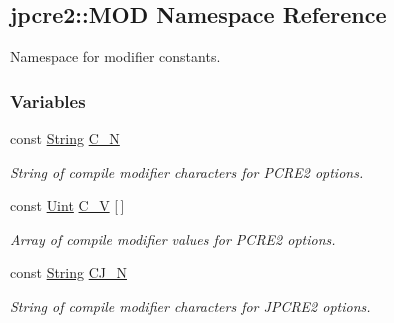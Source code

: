 \hypertarget{namespacejpcre2_1_1MOD}{}\subsection{jpcre2\+:\+:M\+OD Namespace Reference}
\label{namespacejpcre2_1_1MOD}


Namespace for modifier constants.  


\subsubsection*{Variables}
\begin{DoxyCompactItemize}
\item 
\hypertarget{namespacejpcre2_1_1MOD_a3b72b258386dc5ea4a23504e89908247}{}\label{namespacejpcre2_1_1MOD_a3b72b258386dc5ea4a23504e89908247} 
const \hyperlink{namespacejpcre2_a91f03070152fb228bc116c5a737f1d16}{String} \hyperlink{namespacejpcre2_1_1MOD_a3b72b258386dc5ea4a23504e89908247}{C\+\_\+N}
\begin{DoxyCompactList}\small\item\em String of compile modifier characters for P\+C\+R\+E2 options. \end{DoxyCompactList}\item 
\hypertarget{namespacejpcre2_1_1MOD_a78025b5470499fcedb9f9bcb7cc0060b}{}\label{namespacejpcre2_1_1MOD_a78025b5470499fcedb9f9bcb7cc0060b} 
const \hyperlink{namespacejpcre2_a078242d38221a13fb3543b9edd78c099}{Uint} \hyperlink{namespacejpcre2_1_1MOD_a78025b5470499fcedb9f9bcb7cc0060b}{C\+\_\+V} \mbox{[}$\,$\mbox{]}
\begin{DoxyCompactList}\small\item\em Array of compile modifier values for P\+C\+R\+E2 options. \end{DoxyCompactList}\item 
\hypertarget{namespacejpcre2_1_1MOD_aa17f8c8525a87009846a6b9d9e3d1336}{}\label{namespacejpcre2_1_1MOD_aa17f8c8525a87009846a6b9d9e3d1336} 
const \hyperlink{namespacejpcre2_a91f03070152fb228bc116c5a737f1d16}{String} \hyperlink{namespacejpcre2_1_1MOD_aa17f8c8525a87009846a6b9d9e3d1336}{C\+J\+\_\+N}
\begin{DoxyCompactList}\small\item\em String of compile modifier characters for J\+P\+C\+R\+E2 options. \end{DoxyCompactList}\item 
\hypertarget{namespacejpcre2_1_1MOD_a455f33361efc25e03e5a8613de8a0fa0}{}\label{namespacejpcre2_1_1MOD_a455f33361efc25e03e5a8613de8a0fa0} 

\end{DoxyCompactItemize}
